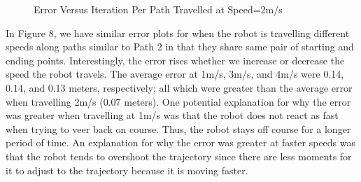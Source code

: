 \documentclass{article}
\begin{document}
\begin{figure}[h]
\begin{center}
\begin{tabular}{c|c|c}
\end{tabular}
\caption{Error Versus Iteration Per Path Travelled at Speed=2m/s}
\end{center}
\end{figure}

In Figure 8, we have similar error plots for when the robot is travelling different speeds along paths similar to Path 2 in that they share same pair of starting and ending points. Interestingly, the error rises whether we increase or decrease the speed the robot travels. The average error at 1m/s, 3m/s, and 4m/s were 0.14, 0.14, and 0.13 meters, respectively; all which were greater than the average error when travelling 2m/s (0.07 meters). One potential explanation for why the error was greater when travelling at 1m/s was that the robot does not react as fast when trying to veer back on course. Thus, the robot stays off course for a longer period of time. An explanation for why the error was greater at faster speeds was that the robot tends to overshoot the trajectory since there are less moments for it to adjust to the trajectory because it is moving faster.

\end{document}
